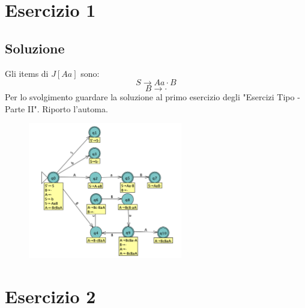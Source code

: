 \documentclass[11pt]{article}
\begin{document}
\section{Esercizio 1}
\subsection*{Soluzione}
Gli items di $J[Aa]$ sono: 
$$S \rightarrow Aa\cdot B$$
$$B \rightarrow \cdot$$
Per lo svolgimento guardare la soluzione al primo esercizio degli "Esercizi Tipo - Parte II".
Riporto l'automa.

\hypertarget{automa_1}{}
\begin{figure}[H]
\centering
  \includegraphics[width=0.6\textwidth]{../2/img/01AutomaSRL.png}
  \label{fig:01-automa}
\end{figure}
\section{Esercizio 2}
\end{document}

